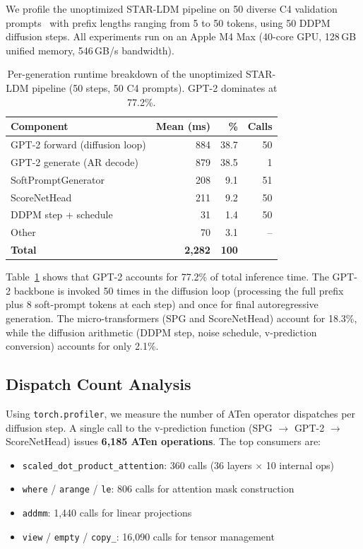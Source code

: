\documentclass[sigconf,authordraft]{acmart}
\begin{document}
We profile the unoptimized STAR-LDM pipeline on 50 diverse C4 validation prompts~\cite{raffel2020exploring} with prefix lengths ranging from 5 to 50 tokens, using 50 DDPM diffusion steps. All experiments run on an Apple M4 Max (40-core GPU, 128\,GB unified memory, 546\,GB/s bandwidth).

\begin{table}[t]
\caption{Per-generation runtime breakdown of the unoptimized STAR-LDM pipeline (50 steps, 50 C4 prompts). GPT-2 dominates at 77.2\%.}
\label{tab:baseline}
\begin{tabular}{lrrr}
\toprule
Component & Mean (ms) & \% & Calls \\
\midrule
GPT-2 forward (diffusion loop) & 884 & 38.7 & 50 \\
GPT-2 generate (AR decode) & 879 & 38.5 & 1 \\
SoftPromptGenerator & 208 & 9.1 & 51 \\
ScoreNetHead & 211 & 9.2 & 50 \\
DDPM step + schedule & 31 & 1.4 & 50 \\
Other & 70 & 3.1 & -- \\
\midrule
\textbf{Total} & \textbf{2{,}282} & \textbf{100} & \\
\bottomrule
\end{tabular}
\end{table}

Table~\ref{tab:baseline} shows that GPT-2 accounts for 77.2\% of total inference time. The GPT-2 backbone is invoked 50 times in the diffusion loop (processing the full prefix plus 8 soft-prompt tokens at each step) and once for final autoregressive generation. The micro-transformers (SPG and ScoreNetHead) account for 18.3\%, while the diffusion arithmetic (DDPM step, noise schedule, v-prediction conversion) accounts for only 2.1\%.

\subsection{Dispatch Count Analysis}

Using \texttt{torch.profiler}, we measure the number of ATen operator dispatches per diffusion step. A single call to the v-prediction function (SPG $\to$ GPT-2 $\to$ ScoreNetHead) issues \textbf{6{,}185 ATen operations}. The top consumers are:

\begin{itemize}
\item \texttt{scaled\_dot\_product\_attention}: 360 calls (36 layers $\times$ 10 internal ops)
\item \texttt{where} / \texttt{arange} / \texttt{le}: 806 calls for attention mask construction
\item \texttt{addmm}: 1{,}440 calls for linear projections
\item \texttt{view} / \texttt{empty} / \texttt{copy\_}: 16{,}090 calls for tensor management
\end{itemize}
\end{document}
